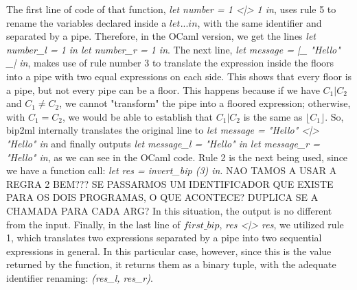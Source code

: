 The first line of code of that function, \emph{let number = 1 <|> 1 in}, uses rule 5 to rename the variables declared inside a $let...in$, with the same identifier and separated by a pipe.
Therefore, in the OCaml version, we get the lines \emph{let number\_l = 1 in let number\_r = 1 in}.
The next line, \emph{let message = |\_ "Hello" \_| in}, makes use of rule number 3 to translate the expression inside the floors into a pipe with two equal expressions on each side.
This shows that every floor is a pipe, but not every pipe can be a floor.
This happens because if we have $C_1 | C_2$ and $C_1 \neq C_2$, we cannot "transform" the pipe into a floored expression; otherwise, with $C_1 = C_2$, we would be able to establish that $C_1 | C_2$ is the same as $\lfloor C_1 \rfloor$.
So, bip2ml internally translates the original line to \emph{let message = "Hello" <|> "Hello" in} and finally outputs \emph{let message\_l = "Hello" in let message\_r = "Hello" in}, as we can see in the OCaml code.
Rule 2 is the next being used, since we have a function call: \emph{let res = invert\_bip (3) in}.
NAO TAMOS A USAR A REGRA 2 BEM??? SE PASSARMOS UM IDENTIFICADOR QUE EXISTE PARA OS DOIS PROGRAMAS, O QUE ACONTECE? DUPLICA SE A CHAMADA PARA CADA ARG?
In this situation, the output is no different from the input.
Finally, in the last line of $first\_bip$, \emph{res <|> res}, we utilized rule 1, which translates two expressions separated by a pipe into two sequential expressions in general.
In this particular case, however, since this is the value returned by the function, it returns them as a binary tuple, with the adequate identifier renaming: \emph{(res\_l, res\_r)}.

